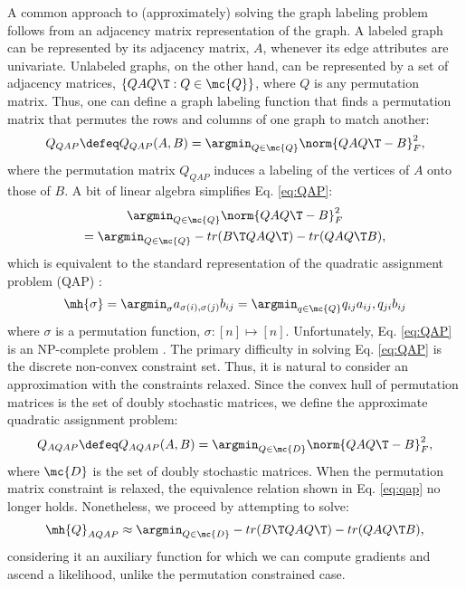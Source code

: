 \documentclass[10pt,journal,cspaper,compsoc]{IEEEtran}
\begin{document}
A common approach to (approximately) solving the graph labeling problem follows from an adjacency matrix representation of the graph.  A labeled graph can be represented by its adjacency matrix, $A$, whenever its edge attributes are univariate.  Unlabeled graphs, on the other hand, can be represented by a set of adjacency matrices, $\{QAQ\T : Q \in \mc{Q}\}$, where $Q$ is any permutation matrix. Thus, one can define a graph labeling function that finds a permutation matrix that permutes the rows and columns of one graph to match another: %
 \begin{align} \label{eq:QAP}
	Q_{QAP} \defeq Q_{QAP}(A,B)= \argmin_{Q \in \mc{Q}} \norm{Q A Q\T - B}^2_F,
\end{align}
where the permutation matrix $Q_{QAP}$ induces a labeling of the vertices of $A$ onto those of $B$. A bit of linear algebra simplifies Eq. \eqref{eq:QAP}: %
\begin{multline} \label{eq:qap}
	\argmin_{Q \in \mc{Q}} \norm{Q A Q\T - B}^2_F \\
	= \argmin_{Q \in \mc{Q}} - tr(B\T QAQ\T) - tr(QAQ\T B),			
\end{multline}
which is equivalent to the standard representation of the quadratic assignment problem (QAP) \cite{Conte2004}:
\begin{align}
	\mh{\sigma}= \argmin_{\sigma} a_{\sigma(i), \sigma(j)} b_{ij} = \argmin_{q \in \mc{Q}} q_{ij} a_{ij}, q_{ji} b_{ij}
\end{align}
where $\sigma$ is a permutation function, $\sigma: [n] \mapsto [n]$.  Unfortunately, Eq. \eqref{eq:QAP} is an NP-complete problem \cite{Garey1979a}. The primary difficulty in solving Eq. \eqref{eq:QAP} is the discrete non-convex constraint set.  Thus, it is natural to consider an approximation with the constraints relaxed.  Since the convex hull of permutation matrices is the set of doubly stochastic matrices, we define the approximate quadratic assignment problem:
\begin{align} \label{eq:tqap}
	Q_{AQAP} \defeq Q_{AQAP}(A,B) = \argmin_{Q \in \mc{D}} \norm{Q A Q\T - B}^2_F,
\end{align}
where $\mc{D}$ is the set of doubly stochastic matrices.  When the permutation matrix constraint is relaxed, the equivalence relation shown in Eq. \eqref{eq:qap} no longer holds.  Nonetheless, we proceed by attempting to solve:
\begin{align} \label{eq:nqap}
	\mh{Q}_{AQAP} \approx \argmin_{Q \in \mc{D}} - tr(B\T QAQ\T) - tr(QAQ\T B),
\end{align}
considering it an auxiliary function for which we can compute gradients and ascend a likelihood, unlike the permutation constrained case.  
\end{document}
